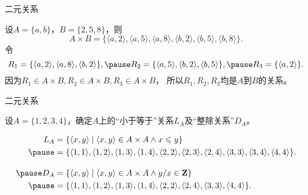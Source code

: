 \begin{frame}{二元关系}
\pause
\begin{exam}
  设$A=\{a,b\}$，$B=\{2,5,8\}$，则 \pause
  $$A \times B=\{\langle a, 2\rangle,\langle a, 5\rangle,\langle a, 8\rangle,\langle b, 2\rangle,\langle b, 5\rangle,\langle b, 8\rangle\}.$$ \pause
  令
  $$R_{1}=\{\langle a, 2\rangle,\langle a, 8\rangle,\langle b, 2\rangle\}, \pause
  R_{2}=\{\langle a, 5\rangle,\langle b, 2\rangle,\langle b, 5\rangle\}, \pause
  R_{3}=\{\langle a, 2\rangle\}.$$\pause
  因为$R_1\in A\times B,R_2\in A\times B,R_3\in A\times B$，\pause
  所以$R_1,R_2,R_3$均是$A$到$B$的关系。
\end{exam}

\end{frame}


\begin{frame}{二元关系}
\pause
\begin{exam}
设$A=\{1,2,3,4\}$，确定$A$上的“小于等于”关系$L_A$及“整除关系”$D_A$。
\end{exam}
\pause
\begin{equation*}\begin{aligned}
L_{A} &=\{\langle x, y\rangle \mid \langle x, y\rangle\in A\times A \wedge x \leqslant y\} \\ \pause
&=\{\langle 1,1\rangle,\langle 1,2\rangle,\langle 1,3\rangle,\langle 1,4\rangle,\langle 2,2\rangle,\langle 2,3\rangle,\langle 2,4\rangle,\langle 3,3\rangle,\langle 3,4\rangle,\langle 4,4\rangle\}.\\[10pt]\pause
D_{A} &=\{\langle x, y\rangle \mid \langle x, y\rangle\in A\times A\wedge y/x\in\mathbf{Z}\} \\ \pause
&=\{\langle 1,1\rangle,\langle 1,2\rangle,\langle 1,3\rangle,\langle 1,4\rangle,\langle 2,2\rangle,\langle 2,4\rangle,\langle 3,3\rangle,\langle 4,4\rangle\}.
\end{aligned}\end{equation*}

\end{frame}

